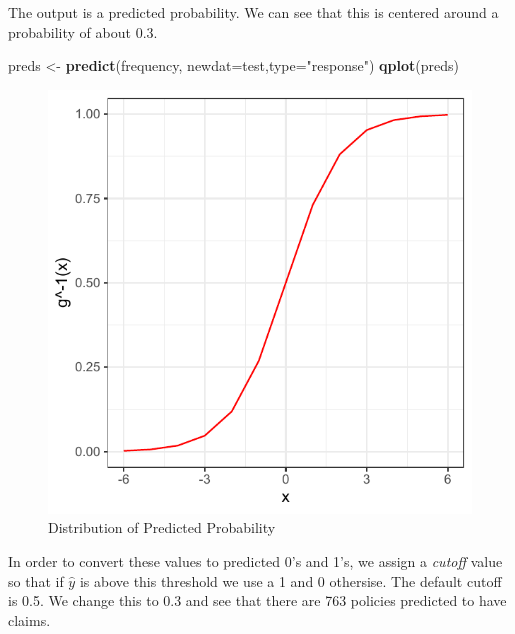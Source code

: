 \documentclass[openany]{book}
\newenvironment{Shaded}{\begin{snugshade}}{\end{snugshade}}
\newcommand{\DataTypeTok}[1]{\textcolor[rgb]{0.13,0.29,0.53}{#1}}
\newcommand{\DecValTok}[1]{\textcolor[rgb]{0.00,0.00,0.81}{#1}}
\newcommand{\KeywordTok}[1]{\textcolor[rgb]{0.13,0.29,0.53}{\textbf{#1}}}
\newcommand{\NormalTok}[1]{#1}
\newcommand{\OperatorTok}[1]{\textcolor[rgb]{0.81,0.36,0.00}{\textbf{#1}}}
\newcommand{\StringTok}[1]{\textcolor[rgb]{0.31,0.60,0.02}{#1}}
\begin{document}
The output is a predicted probability. We can see that this is centered around a probability of about 0.3.

\begin{Shaded}
\begin{Highlighting}[]
\NormalTok{preds <-}\StringTok{ }\KeywordTok{predict}\NormalTok{(frequency, }\DataTypeTok{newdat=}\NormalTok{test,}\DataTypeTok{type=}\StringTok{"response"}\NormalTok{)}
\KeywordTok{qplot}\NormalTok{(preds) }
\end{Highlighting}
\end{Shaded}

\begin{figure}
\centering
\includegraphics{05-linear-models_files/figure-latex/unnamed-chunk-25-1.pdf}
\caption{\label{fig:unnamed-chunk-25}Distribution of Predicted Probability}
\end{figure}

In order to convert these values to predicted 0's and 1's, we assign a \emph{cutoff} value so that if \(\hat{y}\) is above this threshold we use a 1 and 0 othersise. The default cutoff is 0.5. We change this to 0.3 and see that there are 763 policies predicted to have claims.

\begin{Shaded}
\end{Shaded}
\end{document}
